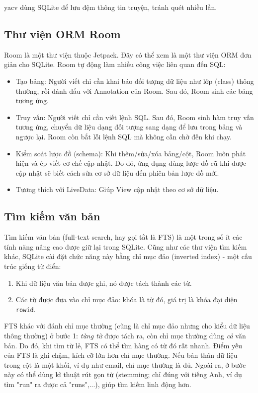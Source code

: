 \documentclass[../../thesis]{subfiles}
\begin{document}
yacv dùng SQLite để lưu đệm thông tin truyện, tránh quét nhiều lần.

\subsection{Thư viện ORM Room}\label{sec:room}

Room là một thư viện thuộc Jetpack. Đây có thể xem là một thư viện ORM đơn giản
cho SQLite. Room tự động làm nhiều công việc liên quan đến SQL:

\begin{itemize}
    \item
        Tạo bảng: Người viết chỉ cần khai báo đối tượng dữ liệu như lớp (class)
        thông thường, rồi đánh dấu với Annotation của Room. Sau đó, Room sinh
        các bảng tương ứng.
    \item
        Truy vấn: Người viết chỉ cần viết lệnh SQL. Sau đó, Room sinh hàm truy
        vấn tương ứng, chuyển dữ liệu dạng đối tượng sang dạng để lưu trong bảng
        và ngược lại. Room còn bắt lỗi lệnh SQL mà không cần chờ đến khi chạy.
    \item
        Kiểm soát lược đồ (schema): Khi thêm/sửa/xóa bảng/cột, Room luôn phát
        hiện và ép viết cơ chế cập nhật. Do đó, ứng dụng dùng lược đồ cũ khi
        được cập nhật sẽ biết cách sửa cơ sở dữ liệu đến phiên bản lược đồ mới.
    \item
        Tương thích với LiveData: Giúp View cập nhật theo cơ sở dữ liệu.
\end{itemize}

\subsection{Tìm kiếm văn bản}\label{sec:fts}

Tìm kiếm văn bản (full-text search, hay gọi tắt là FTS) là một trong số ít các
tính năng nâng cao được giữ lại trong SQLite. Cũng như các thư viện tìm kiếm
khác, SQLite cài đặt chức năng này bằng chỉ mục đảo (inverted index) - một cấu
trúc giống từ điển:

\begin{enumerate}
    \item
        Khi dữ liệu văn bản được ghi, nó được tách thành các từ.
    \item
        Các từ được đưa vào chỉ mục đảo: khóa là từ đó, giá trị là khóa đại diện
        \texttt{rowid}.
\end{enumerate}

FTS khác với đánh chỉ mục thường (cũng là chỉ mục đảo nhưng cho kiểu dữ liệu
thông thường) ở bước 1: \emph{từng từ} được tách ra, còn chỉ mục thường dùng
\emph{cả} văn bản. Do đó, khi tìm từ lẻ, FTS có thể tìm hàng có từ đó rất nhanh.
Điểm yếu của FTS là ghi chậm, kích cỡ lớn hơn chỉ mục thường. Nếu bản thân dữ
liệu trong cột là một khối, ví dụ như email, chỉ mục thường là đủ. Ngoài ra, ở
bước này có thể dùng kĩ thuật rút gọn từ (stemming; chỉ đúng với tiếng Anh, ví
dụ tìm "run" ra được cả "runs",...), giúp tìm kiếm linh động hơn.
\end{document}
